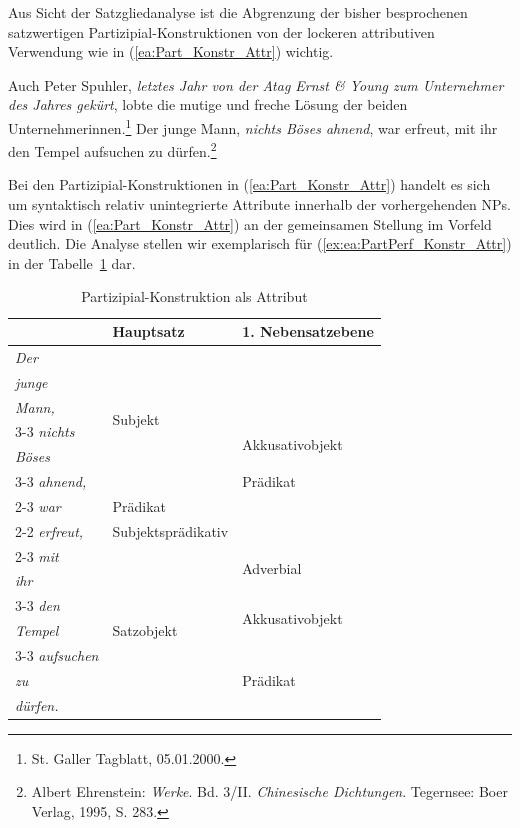 Aus Sicht der Satzgliedanalyse ist die Abgrenzung der bisher besprochenen satzwertigen Partizipial-Konstruktionen von der lockeren attributiven Verwendung wie in (\ref{ea:Part_Konstr_Attr}) wichtig.  

\ea \label{ea:Part_Konstr_Attr}
\ea \label{ea:PartPerf_Konstr_Attr} Auch Peter Spuhler, \textit{letztes Jahr von der Atag Ernst \& Young zum Unternehmer des Jahres gekürt}, lobte die mutige und freche Lösung der beiden Unternehmerinnen.\footnote{St. Galler Tagblatt, 05.01.2000.} 
\ex \label{ex:ea:PartPerf_Konstr_Attr} Der junge Mann, \textit{nichts Böses ahnend}, war erfreut, mit ihr den Tempel aufsuchen zu dürfen.\footnote{Albert Ehrenstein: \textit{Werke}. Bd. 3/II. \textit{Chinesische Dichtungen}. Tegernsee: Boer Verlag, 1995, S. 283.}
\z
\z 

Bei den Partizipial-Konstruktionen in (\ref{ea:Part_Konstr_Attr}) handelt es sich um syntaktisch relativ unintegrierte Attribute innerhalb der vorhergehenden NPs. Dies wird in (\ref{ea:Part_Konstr_Attr}) an der gemeinsamen Stellung im Vorfeld deutlich. Die Analyse stellen wir exemplarisch für (\ref{ex:ea:PartPerf_Konstr_Attr}) in der Tabelle~\ref{tab:Part_Konstr_Attr} dar.


\begin{table}
  \centering
  \begin{tabular}{l|l|l}
      & Hauptsatz  &  1. Nebensatzebene \\
    \hline
    \textit{Der} & \multirow{6}{*}{Subjekt} & \\ 
    \textit{junge} &  & \\ 
    \textit{Mann,} & & \\ \cline{3-3} 
    \textit{nichts} & &  \multirow{2}{*}{Akkusativobjekt} \\
    \textit{Böses} & & \\ \cline{3-3}
    \textit{ahnend,} & & Prädikat \\ \cline{2-3}
    \textit{war} & Prädikat & \\ \cline{2-2}
    \textit{erfreut,} & Subjektsprädikativ & \\ \cline{2-3}
    \textit{mit} & \multirow{7}{*}{Satzobjekt} & \multirow{2}{*}{Adverbial}\\ 
    \textit{ihr} &  &  \\ \cline{3-3}
    \textit{den} & & \multirow{2}{*}{Akkusativobjekt}  \\
    \textit{Tempel} & & \\ \cline{3-3} 
    \textit{aufsuchen} & & \multirow{3}{*}{Prädikat} \\
    \textit{zu} & &\\
    \textit{dürfen.} & & \\
    \hline 
  \end{tabular}
  \caption{Partizipial-Konstruktion als Attribut}
  \label{tab:Part_Konstr_Attr}
\end{table}

